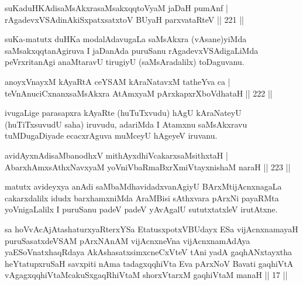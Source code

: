 
\begin{shl}
suKaduHKAdisaMsAkxrasaMsakxqqtoV\s yaM jaDaH pumAnf |\\
rAgadevxVSAdinA\s \s kiSxpatxsatxtoV BUyaH parxvataRteV \hfill || 221 ||
\end{shl}

\begin{artha}
suKa-matutx duHKa modalAdavugaLa saMsAkxra (vAsane)yiMda saMsakxqqtanAgiruva I jaDanAda puruSanu rAgadevxVSAdigaLiMda peVrxritanAgi anaMtaravU tirugiyU (saMsAradalilx) toDaguvanu.
\end{artha}

\begin{shl}
anoyxVnayxM kAyaRtA ceYSAM kAraNatavxM tatheYva ca |\\
teVnAnuciCxnanxsaMsAkxra AtAmx\s yaM pArxkapxrXboVdhataH \hfill || 222 ||
\end{shl}

\begin{artha}
ivugaLige parasapxra kAyaRte (huTuTxvudu) hAgU kAraNateyU (huTiTxsuvudU saha) iruvudu, adariMda I Atamxnu saMsAkxravu tuMDugaDiyade ecacxrAguva muMceyU hAgeyeV iruvanu.
\end{artha}

\begin{shl}
avidAyxnAdisaMbanodhxV mithAyxdhiVcakarxsaMsithxtaH |\\
AbarxhAmx\s \s sAthxNavxyaM yoVniVbaRmaBxrXmiVtayxnishaM naraH \hfill || 223 ||
\end{shl}

\begin{artha}
matutx avideyxya anAdi saMbaMdhavidadxvanAgiyU BArxMtijAcnxnagaLa cakarxdalilx idudx barxhamxniMda AraMBisi sAthxvara pArxNi payaRMta yoVnigaLalilx I puruSanu padeV padeV yAvAgalU sututxtatxleV irutAtxne.
\end{artha}


\begin{kandikeshl}
sa hoVvAcAjAtashaturxyaRterxYSa EtatusxpotxV\s BUdayx ESa vijAcnxnamayaH puruSasatxdeVSAM pArxNAnAM vijAcnxneVna vijAcnxnamAdAya ya\break ESoV\s natxhaqRdaya AkAshasatxsimxcneCxVteV tAni yadA gaqhANxtayxtha heYtatupxruSaH savxpiti nAma tadagxqqhiVta Eva pArxNoV Bavati gaqhiVtA vAgagxqqhiVtaM\break cakuSxgaqRhiVtaM shorxVtarxM gaqhiVtaM manaH || 17 ||
\end{kandikeshl}

